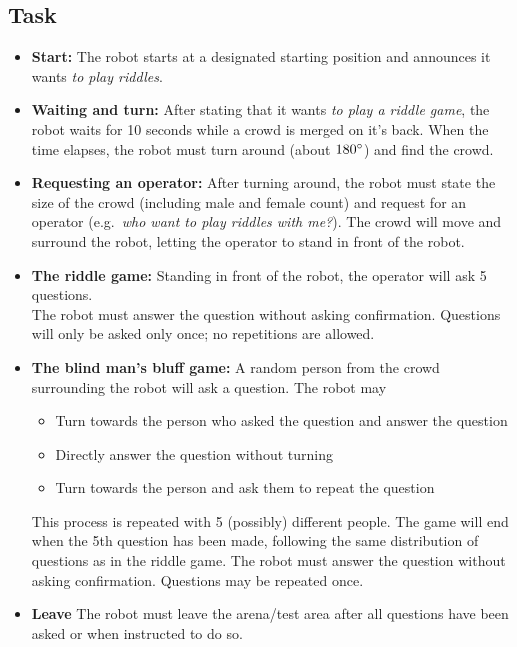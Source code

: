 \subsection{Task}
\begin{itemize}
    \item \textbf{Start:} The robot starts at a designated starting position and announces it wants \textit{to play riddles}.

    \item \textbf{Waiting and turn:} After stating that it wants \textit{to play a riddle game}, the robot waits for 10 seconds while a crowd is merged on it's back. When the time elapses, the robot must turn around (about $180\degree$) and find the crowd.

    \item \textbf{Requesting an operator:} After turning around, the robot must state the size of the crowd (including male and female count\footnotemark) and request for an operator (e.g.~\textit{who want to play riddles with me?}). The crowd will move and surround the robot, letting the operator to stand in front of the robot.

    \item \textbf{The riddle game:} Standing in front of the robot, the operator will ask 5 questions.\\
    The robot must answer the question without asking confirmation. Questions will only be asked only once; no repetitions are allowed. 

    \item \textbf{The blind man's bluff game:} A random person from the crowd surrounding the robot will ask a question. The robot may
    \begin{itemize}
        \item Turn towards the person who asked the question and answer the question
        \item Directly answer the question without turning
        \item Turn towards the person and ask them to repeat the question
    \end{itemize}
    This process is repeated with 5 (possibly) different people. 
    The game will end when the 5th question has been made, following the same distribution of questions as in the riddle game. The robot must answer the question without asking confirmation. Questions may be repeated once.
    
    \item \textbf{Leave} The robot must leave the arena/test area after all questions have been asked or when instructed to do so.
\end{itemize}

